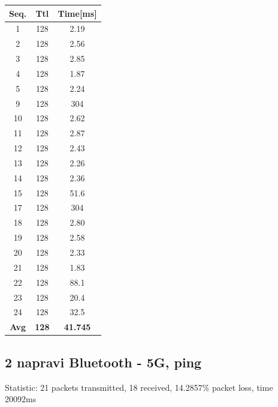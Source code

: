 \documentclass[11pt,a4paper,slovene]{article}
\begin{document}
 
\begin{table}[H]
	\begin{adjustwidth}{-3cm}{-3cm}
	\centering
		\begin{tabular}{c|c|c}
		\hline
		\textbf{Seq.} & \textbf{Ttl} & \textbf{Time[ms]}\\
     	\hline
     	1 & 128 & 2.19\\
  		2 & 128 & 2.56\\
  		3 & 128 & 2.85\\
  		4 & 128 & 1.87\\
  		5 & 128 & 2.24\\
  		9 & 128 & 304\\
  		10 & 128 & 2.62\\
  		11 & 128 & 2.87\\
  		12 & 128 & 2.43\\
  		13 & 128 & 2.26\\
  		14 & 128 & 2.36\\
  		15 & 128 & 51.6\\
  		17 & 128 & 304\\
  		18 & 128 & 2.80\\
  		19 & 128 & 2.58\\
  		20 & 128 & 2.33\\
  		21 & 128 & 1.83\\
  		22 & 128 & 88.1\\
  		23 & 128 & 20.4\\
  		24 & 128 & 32.5\\
  		\hline
  		\textbf{Avg} & \textbf{128} & \textbf{41.745}\\
  		\hline
  		\end{tabular}
    	\end{adjustwidth}
\end{table}

\subsection{2 napravi Bluetooth - 5G, ping}

Statistic: 21 packets transmitted, 18 received, 14.2857\% packet loss, time 20092ms
 
\end{document}
